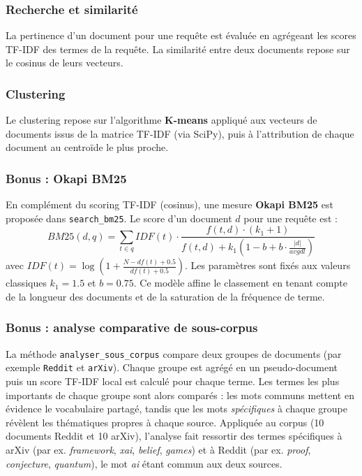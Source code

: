 \documentclass[12pt,a4paper]{article}
\begin{document}
\subsubsection{Recherche et similarité}
La pertinence d'un document pour une requête est évaluée en agrégeant les scores TF-IDF des termes de la requête. La similarité entre deux documents repose sur le cosinus de leurs vecteurs.

\subsubsection{Clustering}
Le clustering repose sur l'algorithme \textbf{K-means} appliqué aux vecteurs de documents issus de la matrice TF-IDF (via SciPy), puis à l'attribution de chaque document au centroïde le plus proche.

\subsubsection{Bonus : Okapi BM25}
En complément du scoring TF-IDF (cosinus), une mesure \textbf{Okapi BM25} est proposée dans \texttt{search\_bm25}. Le score d'un document $d$ pour une requête est :
$$BM25(d,q) = \sum_{t \in q} IDF(t)\cdot\frac{f(t,d)\cdot(k_1+1)}{f(t,d)+k_1\left(1-b+b\cdot\frac{|d|}{avgdl}\right)}$$
avec $IDF(t)=\log\left(1+\frac{N-df(t)+0.5}{df(t)+0.5}\right)$. Les paramètres sont fixés aux valeurs classiques $k_1=1.5$ et $b=0.75$. Ce modèle affine le classement en tenant compte de la longueur des documents et de la saturation de la fréquence de terme.

\subsubsection{Bonus : analyse comparative de sous-corpus}
La méthode \texttt{analyser\_sous\_corpus} compare deux groupes de documents (par exemple \texttt{Reddit} et \texttt{arXiv}). Chaque groupe est agrégé en un pseudo-document puis un score TF-IDF local est calculé pour chaque terme. Les termes les plus importants de chaque groupe sont alors comparés : les mots communs mettent en évidence le vocabulaire partagé, tandis que les mots \emph{spécifiques} à chaque groupe révèlent les thématiques propres à chaque source. Appliquée au corpus (10 documents Reddit et 10 arXiv), l'analyse fait ressortir des termes spécifiques à arXiv (par ex. \emph{framework}, \emph{xai}, \emph{belief}, \emph{games}) et à Reddit (par ex. \emph{proof}, \emph{conjecture}, \emph{quantum}), le mot \emph{ai} étant commun aux deux sources.
\end{document}
